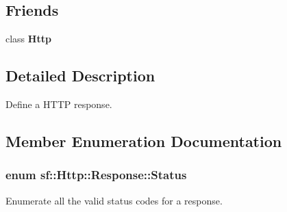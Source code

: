 \subsection*{Friends}
\begin{DoxyCompactItemize}
\item 
\hypertarget{classsf_1_1_http_1_1_response_aba95e2a7762bb5df986048b05d03a22e}{class {\bfseries Http}}\label{classsf_1_1_http_1_1_response_aba95e2a7762bb5df986048b05d03a22e}

\end{DoxyCompactItemize}


\subsection{Detailed Description}
Define a H\+T\+T\+P response. 

\subsection{Member Enumeration Documentation}
\hypertarget{classsf_1_1_http_1_1_response_a663e071978e30fbbeb20ed045be874d8}{
\subsubsection[{Status}]{\setlength{\rightskip}{0pt plus 5cm}enum {\bf sf\+::\+Http\+::\+Response\+::\+Status}}}\label{classsf_1_1_http_1_1_response_a663e071978e30fbbeb20ed045be874d8}


Enumerate all the valid status codes for a response. 

